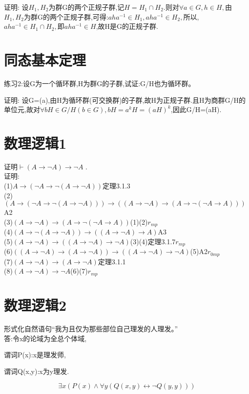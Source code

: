\documentclass[12pt]{article}
\begin{document}
证明:
设$H_1,H_2$为群G的两个正规子群,记$H=H_1\cap H_2$.则对$\forall a\in G,h\in H,$由$H_1,H_2$为群G的两个正规子群,可得:$aha^{-1} \in H_1,aha^{-1}\in H_2,$所以,$aha^{-1} \in H_1\cap H_2,$即$aha^{-1}\in H$,故H是G的正规子群.
\newpage
\section{同态基本定理}
\noindent 练习2:设G为一个循环群,H为群G的子群,试证:G/H也为循环群。

证明:
设G=(a),由H为循环群(可交换群)的子群,故H为正规子群.且H为商群G/H的单位元,故对$\forall bH \in G/H(b \in G),bH=a^kH=(aH)^k$,因此G/H=(aH).

\newpage
\section{数理逻辑1}
\noindent 证明$\vdash(A\to \lnot A)\rightarrow \lnot A$ .\\
证明:\\
(1)$A\to (\lnot A\to \lnot (A\to \lnot A))$\hspace{1.5em}定理3.1.3\\
(2)$(A \to (\lnot A \to \lnot(A \to \lnot A))) \to ((A \to \lnot A) \to (A \to \lnot (\lnot A \to A)))$\hspace{1.5em}A2\\
(3)${(A \to \lnot A) \to (A \to \lnot (\lnot A \to A))}$\hspace{1.5em}(1)(2)$r_{mp}$\\
(4)$(A \to \lnot(A \to \lnot A))\to ((A \to \lnot A) \to A)$\hspace{1.5em}A3\\
(5)$(A \to \lnot A)\to ((A \to \lnot A)\to \lnot A)$\hspace{1.5em}(3)(4)定理3.1.7$r_{mp}$\\
(6)$((A \to \lnot A)\to (A \to \lnot A))\to ((A\to \lnot A)\to \lnot A)$\hspace{1.5em}(5)A2$r_{0mp}$\\
(7)$(A \to \lnot A)\to (A\to \lnot A)$\hspace{1.5em}定理3.1.1\\
(8)$(A \to \lnot A)\to \lnot A$\hspace{1.5em}(6)(7)$r_{mp}$\\


\newpage
\section{数理逻辑2}
\noindent 形式化自然语句“我为且仅为那些部位自己理发的人理发。”\\
答:令x的论域为全总个体域,

谓词P(x):x是理发师,

谓词Q(x,y):x为y理发.

\[\exists x(P(x)\wedge \forall y(Q(x,y)\leftrightarrow \lnot Q(y,y)))\]
\end{document}
